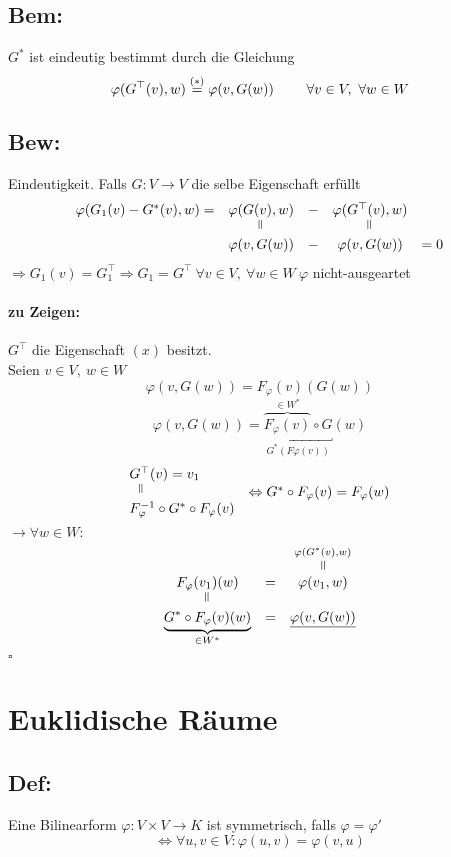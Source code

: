 \documentclass[titlepage,12pt,a4paper,ngerman]{report}
\newenvironment{bew}{\subsection{Bew:}}{\hfill$\square$}
\newcommand{\Bew}[1]{\begin{bew}#1\end{bew}}
\newcommand{\verteq}{\rotatebox{90}{$\,=$}}
\newcommand{\equaltoup}[2]{\overset{\scriptstyle\underset{\mkern4mu\verteq}{#2}}{#1}}
\begin{document}
\subsection*{Bem:}
$G^*$ ist eindeutig bestimmt durch die Gleichung 
$$\varphi(G^\top(v),w) \buildrel (*) \over = \varphi(v,G(w))\qquad \ \forall v \in V,\ \forall w \in W$$
\Bew{
	Eindeutigkeit. Falls $G:V\to V$ die selbe Eigenschaft erfüllt
	$$ \begin{array}{ccccc}
	\varphi(G_1(v) - G^* (v),w) = & \varphi(G(v),w) & - & \varphi (G^\top (v),w) \\
	& \verteq & &  \verteq \\
	& \varphi(v, G(w)) & - & \varphi(v,G(w)) & = 0
	\end{array}$$
	$\Rightarrow G_1(v) = G_1^\top \Rightarrow G_1=G^\top\ \forall v \in V,\ \forall w \in W\ \varphi$ nicht-ausgeartet 
	\paragraph{zu Zeigen:} $G^\top$ die Eigenschaft $(x)$ besitzt.\\
	Seien \underline{$v \in V,\ w \in W$} 
	$$\varphi(v,G(w)) = F_\varphi(v)(G(w))$$
	$$\varphi(v,G(w)) = \underbracket{\overbrace{F_\varphi(v)}^{\in W^*} \circ G}_{G^*(F\varphi(v))}(w)$$
	$$ \begin{array}{lc}
	G^\top(v)  = v_1 \\
	\ \ \verteq & \Leftrightarrow G^* \circ F_\varphi(v) = F_\varphi(w)\\
	F^{-1}_{\varphi}\circ G^* \circ F_\varphi(v)
	\end{array}$$
	$\rightarrow \forall w \in W:$
	$$\begin{array}{ccc}
	F_\varphi(v_1)(w) & = & \equaltoup{\varphi(v_1,w)}{\varphi(G^*(v),w)}\\
	\verteq \\
	\underbrace{G^* \circ F_\varphi(v)(w)}_{\in W^*} & = & \underline{\varphi(v,G(w))}
	\end{array}$$
}

\section{Euklidische Räume}
\subsection{Def:}
Eine Bilinearform $ \varphi: V \times V \to K$ ist symmetrisch, falls $ \varphi = \varphi' $ 
$$ \Leftrightarrow \forall u,v \in V : \varphi(u,v) = \varphi(v,u) $$
\end{document}
